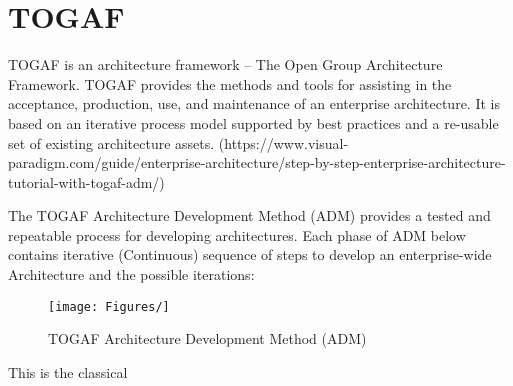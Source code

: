 \section{TOGAF}
TOGAF is an architecture framework – The Open Group Architecture Framework. TOGAF provides the methods and tools for assisting in the acceptance, production, use, and maintenance of an enterprise architecture. It is based on an iterative process model supported by best practices and a re-usable set of existing architecture assets. (https://www.visual-paradigm.com/guide/enterprise-architecture/step-by-step-enterprise-architecture-tutorial-with-togaf-adm/)

The TOGAF Architecture Development Method (ADM) provides a tested and repeatable process for developing architectures. Each phase of ADM below contains iterative (Continuous) sequence of steps to develop an enterprise-wide Architecture and the possible iterations:

\begin{figure*}[tbp]
\centering
\texttt{[image: Figures/]}
\caption{TOGAF Architecture Development Method (ADM)}
\label{fig:2}
\end{figure*}

This is the classical 


